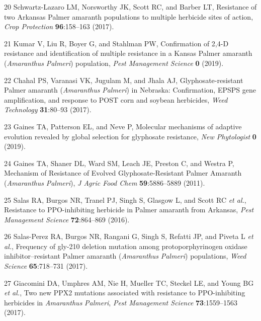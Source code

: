 \documentclass[
  12pt,
  a4paper]{article}
\begin{document}
\leavevmode\hypertarget{ref-schwartz-lazaro_resistance_2017}{}%
20 Schwartz-Lazaro LM, Norsworthy JK, Scott RC, and Barber LT,
Resistance of two Arkansas Palmer amaranth populations to multiple
herbicide sites of action, \emph{Crop Protection} \textbf{96}:158--163
(2017).

\leavevmode\hypertarget{ref-kumar_confirmation_2019}{}%
21 Kumar V, Liu R, Boyer G, and Stahlman PW, Confirmation of 2,4-D
resistance and identification of multiple resistance in a Kansas Palmer
amaranth (\emph{Amaranthus} \emph{Palmeri}) population, \emph{Pest
Management Science} \textbf{0} (2019).

\leavevmode\hypertarget{ref-chahal_glyphosate-resistant_2017}{}%
22 Chahal PS, Varanasi VK, Jugulam M, and Jhala AJ, Glyphosate-resistant
Palmer amaranth (\emph{Amaranthus} \emph{Palmeri}) in Nebraska:
Confirmation, EPSPS gene amplification, and response to POST corn and
soybean herbicides, \emph{Weed Technology} \textbf{31}:80--93 (2017).

\leavevmode\hypertarget{ref-gaines_molecular_2019}{}%
23 Gaines TA, Patterson EL, and Neve P, Molecular mechanisms of adaptive
evolution revealed by global selection for glyphosate resistance,
\emph{New Phytologist} \textbf{0} (2019).

\leavevmode\hypertarget{ref-gaines_mechanism_2011}{}%
24 Gaines TA, Shaner DL, Ward SM, Leach JE, Preston C, and Westra P,
Mechanism of Resistance of Evolved Glyphosate-Resistant Palmer Amaranth
(\emph{Amaranthus} \emph{Palmeri}), \emph{J Agric Food Chem}
\textbf{59}:5886--5889 (2011).

\leavevmode\hypertarget{ref-salas_resistance_2016}{}%
25 Salas RA, Burgos NR, Tranel PJ, Singh S, Glasgow L, and Scott RC
\emph{et al.}, Resistance to PPO-inhibiting herbicide in Palmer amaranth
from Arkansas, \emph{Pest Management Science} \textbf{72}:864--869
(2016).

\leavevmode\hypertarget{ref-salas-perez_frequency_2017}{}%
26 Salas-Perez RA, Burgos NR, Rangani G, Singh S, Refatti JP, and Piveta
L \emph{et al.}, Frequency of gly-210 deletion mutation among
protoporphyrinogen oxidase inhibitor--resistant Palmer amaranth
(\emph{Amaranthus} \emph{Palmeri}) populations, \emph{Weed Science}
\textbf{65}:718--731 (2017).

\leavevmode\hypertarget{ref-giacomini_two_2017-1}{}%
27 Giacomini DA, Umphres AM, Nie H, Mueller TC, Steckel LE, and Young BG
\emph{et al.}, Two new PPX2 mutations associated with resistance to
PPO-inhibiting herbicides in \emph{Amaranthus} \emph{Palmeri},
\emph{Pest Management Science} \textbf{73}:1559--1563 (2017).
\end{document}
